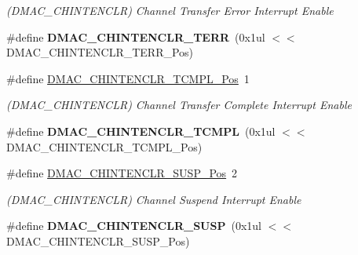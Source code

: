 \begin{DoxyCompactItemize}
\begin{DoxyCompactList}\small\item\em (D\+M\+A\+C\+\_\+\+C\+H\+I\+N\+T\+E\+N\+C\+L\+R) Channel Transfer Error Interrupt Enable \end{DoxyCompactList}\item 
\hypertarget{group___s_a_m_l21___d_m_a_c_gae0c2f9d2b22d8e0bd06a535aa83a9bbe}{}\#define {\bfseries D\+M\+A\+C\+\_\+\+C\+H\+I\+N\+T\+E\+N\+C\+L\+R\+\_\+\+T\+E\+R\+R}~(0x1ul $<$$<$ D\+M\+A\+C\+\_\+\+C\+H\+I\+N\+T\+E\+N\+C\+L\+R\+\_\+\+T\+E\+R\+R\+\_\+\+Pos)\label{group___s_a_m_l21___d_m_a_c_gae0c2f9d2b22d8e0bd06a535aa83a9bbe}

\item 
\hypertarget{group___s_a_m_l21___d_m_a_c_gab02512335095b2ff57b466ad814d7ebd}{}\#define \hyperlink{group___s_a_m_l21___d_m_a_c_gab02512335095b2ff57b466ad814d7ebd}{D\+M\+A\+C\+\_\+\+C\+H\+I\+N\+T\+E\+N\+C\+L\+R\+\_\+\+T\+C\+M\+P\+L\+\_\+\+Pos}~1\label{group___s_a_m_l21___d_m_a_c_gab02512335095b2ff57b466ad814d7ebd}

\begin{DoxyCompactList}\small\item\em (D\+M\+A\+C\+\_\+\+C\+H\+I\+N\+T\+E\+N\+C\+L\+R) Channel Transfer Complete Interrupt Enable \end{DoxyCompactList}\item 
\hypertarget{group___s_a_m_l21___d_m_a_c_ga09d4a2bc7858fd164be9782665d2f559}{}\#define {\bfseries D\+M\+A\+C\+\_\+\+C\+H\+I\+N\+T\+E\+N\+C\+L\+R\+\_\+\+T\+C\+M\+P\+L}~(0x1ul $<$$<$ D\+M\+A\+C\+\_\+\+C\+H\+I\+N\+T\+E\+N\+C\+L\+R\+\_\+\+T\+C\+M\+P\+L\+\_\+\+Pos)\label{group___s_a_m_l21___d_m_a_c_ga09d4a2bc7858fd164be9782665d2f559}

\item 
\hypertarget{group___s_a_m_l21___d_m_a_c_gab587797c908dc5496635204dbcef19db}{}\#define \hyperlink{group___s_a_m_l21___d_m_a_c_gab587797c908dc5496635204dbcef19db}{D\+M\+A\+C\+\_\+\+C\+H\+I\+N\+T\+E\+N\+C\+L\+R\+\_\+\+S\+U\+S\+P\+\_\+\+Pos}~2\label{group___s_a_m_l21___d_m_a_c_gab587797c908dc5496635204dbcef19db}

\begin{DoxyCompactList}\small\item\em (D\+M\+A\+C\+\_\+\+C\+H\+I\+N\+T\+E\+N\+C\+L\+R) Channel Suspend Interrupt Enable \end{DoxyCompactList}\item 
\hypertarget{group___s_a_m_l21___d_m_a_c_gaf764c5eefd5c1615fe0b96b7b52efac7}{}\#define {\bfseries D\+M\+A\+C\+\_\+\+C\+H\+I\+N\+T\+E\+N\+C\+L\+R\+\_\+\+S\+U\+S\+P}~(0x1ul $<$$<$ D\+M\+A\+C\+\_\+\+C\+H\+I\+N\+T\+E\+N\+C\+L\+R\+\_\+\+S\+U\+S\+P\+\_\+\+Pos)\label{group___s_a_m_l21___d_m_a_c_gaf764c5eefd5c1615fe0b96b7b52efac7}


\end{DoxyCompactItemize}
